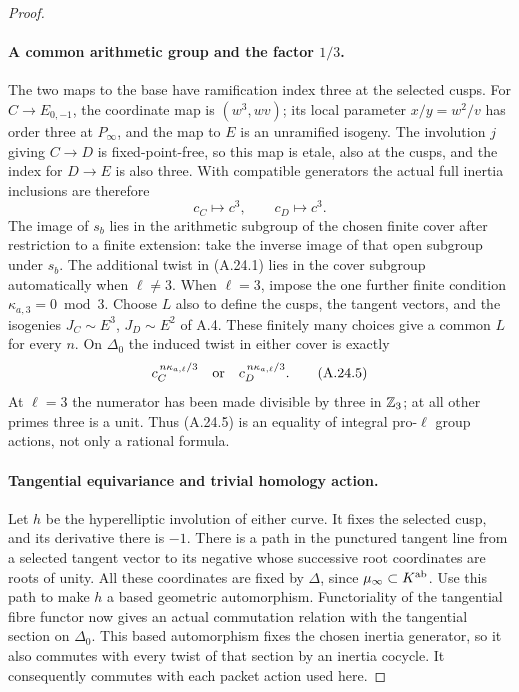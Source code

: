 \begin{proof}
\paragraph{A common arithmetic group and the factor $1/3$.}
The two maps to the base have ramification index three at the
selected cusps. For $C\to E_{0,-1}$, the coordinate map is
$(w^3,wv)$; its local parameter $x/y=w^2/v$ has order three
at $P_\infty$, and the map to $E$ is an unramified isogeny.
The involution $j$ giving $C\to D$ is fixed-point-free, so this
map is etale, also at the cusps, and the index for $D\to E$
is also three. With compatible generators the actual full
inertia inclusions are therefore
\[
                 c_C\longmapsto c^3,\qquad
                 c_D\longmapsto c^3.                    \tag{A.24.4}
\]
The image of $s_b$ lies in the arithmetic subgroup of the
chosen finite cover after restriction to a finite extension:
take the inverse image of that open subgroup under $s_b$.
The additional twist in (A.24.1) lies in the cover subgroup
automatically when $\ell\ne3$. When $\ell=3$, impose the one
further finite condition $\kappa_{a,3}=0\bmod3$.
Choose $L$ also to define the cusps, the tangent vectors, and
the isogenies $J_C\sim E^3$, $J_D\sim E^2$ of A.4.
These finitely many choices give a common $L$ for every $n$.
On $\Delta_0$ the induced twist in either cover is exactly
\[
                  c_C^{\,n\kappa_{a,\ell}/3}
             \quad\hbox{or}\quad
                  c_D^{\,n\kappa_{a,\ell}/3}.             \tag{A.24.5}
\]
At $\ell=3$ the numerator has been made divisible by three
in $\mathbb Z_3$; at all other primes three is a unit. Thus (A.24.5)
is an equality of integral pro-$\ell$ group actions, not
only a rational formula.

\paragraph{Tangential equivariance and trivial homology action.}
Let $h$ be the hyperelliptic involution of either curve.
It fixes the selected cusp, and its derivative there is $-1$.
There is a path in the punctured tangent line from a selected
tangent vector to its negative whose successive root
coordinates are roots of unity. All these coordinates are
fixed by $\Delta$, since $\mu_\infty\subset K^{\rm ab}$.
Use this path to make $h$ a based geometric automorphism.
Functoriality of the tangential fibre functor now gives an
actual commutation relation with the tangential section on
$\Delta_0$. This based automorphism fixes the chosen inertia
generator, so it also commutes with every twist of that
section by an inertia cocycle. It consequently commutes with
each packet action used here.


\end{proof}
